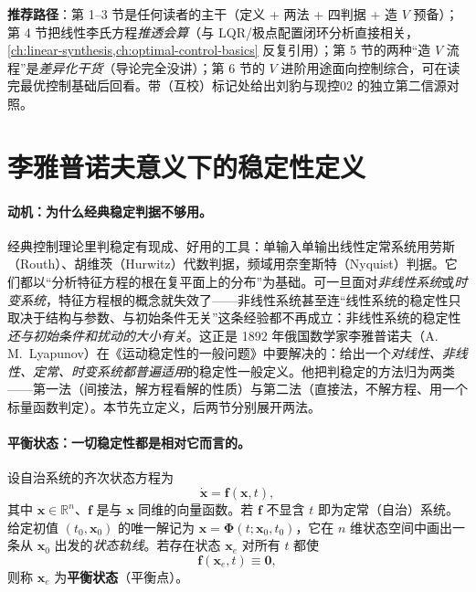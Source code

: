 \noindent\textbf{推荐路径}：第 1--3 节是任何读者的主干（定义 + 两法 + 四判据 + 造 $V$ 预备）；第 4 节把线性李氏方程\emph{推透会算}（与 LQR/极点配置闭环分析直接相关，\cref{ch:linear-synthesis,ch:optimal-control-basics} 反复引用）；第 5 节的两种“造 $V$ 流程”是\emph{差异化干货}（导论完全没讲）；第 6 节的 $V$ 进阶用途面向控制综合，可在读完最优控制基础后回看。带（互校）标记处给出刘豹与现控02 的独立第二信源对照。

\section{李雅普诺夫意义下的稳定性定义}
\label{sec:lyap-def}

\paragraph{动机：为什么经典稳定判据不够用。}
经典控制理论里判稳定有现成、好用的工具：单输入单输出线性定常系统用劳斯（Routh）、胡维茨（Hurwitz）代数判据，频域用奈奎斯特（Nyquist）判据\cite{khalil2002nonlinear}。它们都以“分析特征方程的根在复平面上的分布”为基础。可一旦面对\emph{非线性系统}或\emph{时变系统}，特征方程根的概念就失效了——非线性系统甚至连“线性系统的稳定性只取决于结构与参数、与初始条件无关”这条经验都不再成立：非线性系统的稳定性\emph{还与初始条件和扰动的大小有关}。这正是 1892 年俄国数学家李雅普诺夫（A.\,M.~Lyapunov）在《运动稳定性的一般问题》中要解决的：给出一个\emph{对线性、非线性、定常、时变系统都普遍适用}的稳定性一般定义\cite{lyapunov1992general}。他把判稳定的方法归为两类——第一法（间接法，解方程看解的性质）与第二法（直接法，不解方程、用一个标量函数判定）。本节先立定义，后两节分别展开两法。

\paragraph{平衡状态：一切稳定性都是相对它而言的。}
设自治系统的齐次状态方程为
\begin{equation}
  \dot{\mathbf{x}}=\mathbf{f}(\mathbf{x},t),
  \label{eq:lyap-sys}
\end{equation}
其中 $\mathbf{x}\in\mathbb{R}^n$、$\mathbf{f}$ 是与 $\mathbf{x}$ 同维的向量函数。若 $\mathbf{f}$ 不显含 $t$ 即为定常（自治）系统。给定初值 $(t_0,\mathbf{x}_0)$ 的唯一解记为 $\mathbf{x}=\boldsymbol\Phi(t;\mathbf{x}_0,t_0)$，它在 $n$ 维状态空间中画出一条从 $\mathbf{x}_0$ 出发的\emph{状态轨线}。若存在状态 $\mathbf{x}_e$ 对所有 $t$ 都使
\begin{equation}
  \mathbf{f}(\mathbf{x}_e,t)\equiv\mathbf{0},
  \label{eq:equilibrium}
\end{equation}
则称 $\mathbf{x}_e$ 为\textbf{平衡状态}（平衡点）。

